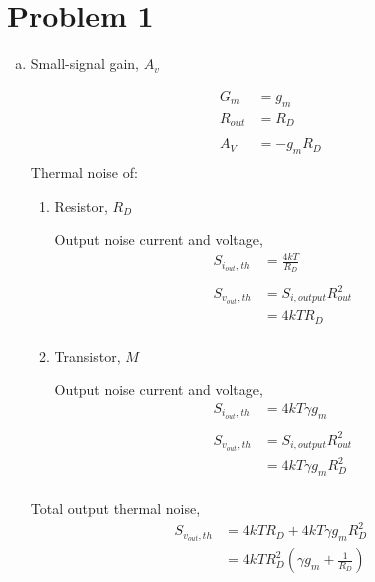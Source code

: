 \documentclass{article}
\begin{document}
\section{Problem 1}
\label{sec:orgc82a2fa}
\begin{enumerate}[(a)]
\item Small-signal gain, \(A_{v}\)

\begin{equation*}
\begin{aligned}
G_{m} &= g_{m} \\
R_{out} &= R_{D} \\
\\
A_{V} &= -g_{m}R_{D} \\
\end{aligned}
\end{equation*}
Thermal noise of:
\begin{enumerate}[1.]
\item Resistor, \(R_{D}\)

Output noise current and voltage,
\begin{equation*}
\begin{aligned}
S_{i_{out}, th} &= \frac{4kT}{R_{D}} \\
\\
S_{v_{out}, th} &= S_{i, output}R_{out}^{2} \\
&= 4kTR_{D} \\
\end{aligned}
\end{equation*}

\item Transistor, \(M\)

Output noise current and voltage,
\begin{equation*}
\begin{aligned}
S_{i_{out}, th} &= 4kT\gamma{}g_{m} \\
\\
S_{v_{out}, th} &= S_{i, output}R_{out}^{2} \\
&= 4kT\gamma{}g_{m}R_{D}^{2} \\
\end{aligned}
\end{equation*}
\end{enumerate}

Total output thermal noise,
\begin{equation*}
\begin{aligned}
S_{v_{out}, th} &= 4kTR_{D} + 4kT\gamma{}g_{m}R_{D}^{2} \\
&= 4kTR_{D}^{2}(\gamma{}g_{m} + \frac{1}{R_{D}}) \\
\end{aligned}
\end{equation*}


\end{enumerate}
\end{document}
